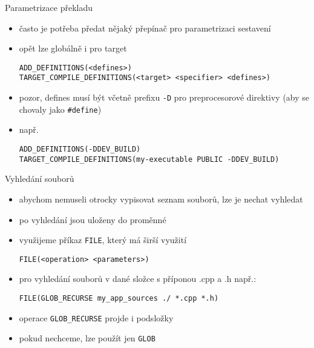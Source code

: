 \documentclass{beamer}
\begin{document}
\begin{xframe}{Parametrizace překladu}
	\begin{itemize}
		\item často je potřeba předat nějaký přepínač pro parametrizaci sestavení
		\item opět lze globálně i pro target
\begin{lstlisting}[basicstyle=\fontsize{8}{9}\selectfont\ttfamily]
ADD_DEFINITIONS(<defines>)
TARGET_COMPILE_DEFINITIONS(<target> <specifier> <defines>)
\end{lstlisting}
		\item pozor, defines musí být včetně prefixu \texttt{-D} pro preprocesorové direktivy (aby se chovaly jako \texttt{\#define})
		\item např.
\begin{lstlisting}[basicstyle=\fontsize{8}{9}\selectfont\ttfamily]
ADD_DEFINITIONS(-DDEV_BUILD)
TARGET_COMPILE_DEFINITIONS(my-executable PUBLIC -DDEV_BUILD)
\end{lstlisting}
	\end{itemize}
\end{xframe}


\begin{xframe}{Vyhledání souborů}
	\begin{itemize}
		\item abychom nemuseli otrocky vypisovat seznam souborů, lze je nechat vyhledat
		\item po vyhledání jsou uloženy do proměnné
		\item využijeme příkaz \texttt{FILE}, který má širší využití
\begin{lstlisting}[basicstyle=\fontsize{8}{9}\selectfont\ttfamily]
FILE(<operation> <parameters>)
\end{lstlisting}
		\item pro vyhledání souborů v dané složce s příponou .cpp a .h např.:
\begin{lstlisting}[basicstyle=\fontsize{8}{9}\selectfont\ttfamily]
FILE(GLOB_RECURSE my_app_sources ./ *.cpp *.h)
\end{lstlisting}
		\item operace \texttt{GLOB\_RECURSE} projde i podsložky
		\item pokud nechceme, lze použít jen \texttt{GLOB}
	\end{itemize}
\end{xframe}
\end{document}
